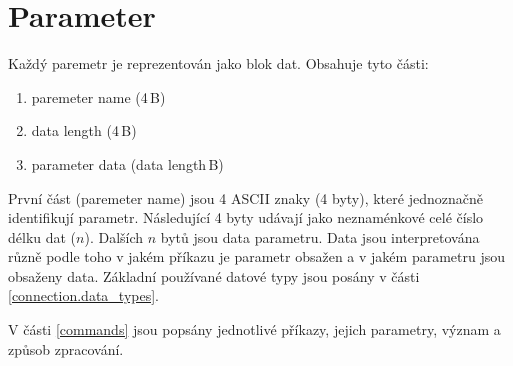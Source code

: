 \section{Parameter}
\label{up_layer.collab_message.parameter}

Každý paremetr je reprezentován jako blok dat. Obsahuje tyto části:

\begin{enumerate}
	\item paremeter name (4\,{}B)
	\item data length (4\,{}B)
	\item parameter data (data length\,{}B)
\end{enumerate}

První část (paremeter name) jsou 4 ASCII znaky (4 byty), které jednoznačně identifikují parametr. Následující 4 byty udávají jako neznaménkové celé číslo délku dat ($n$). Dalších $n$ bytů jsou data parametru. Data jsou interpretována různě podle toho v jakém příkazu je parametr obsažen a v jakém parametru jsou obsaženy data. Základní používané datové typy jsou posány v části \ref{connection.data_types}.

V části \ref{commands} jsou popsány jednotlivé příkazy, jejich parametry, význam a způsob zpracování.